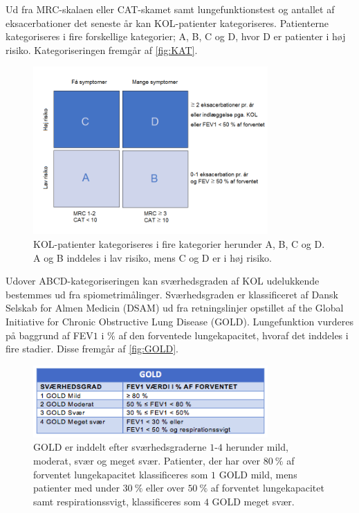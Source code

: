 Ud fra MRC-skalaen eller CAT-skamet samt lungefunktionstest og antallet af eksacerbationer det seneste år kan KOL-patienter kategoriseres. Patienterne kategoriseres i fire forskellige kategorier; A, B, C og D, hvor D er patienter i høj risiko. Kategoriseringen fremgår af \autoref{fig:KAT}.

\begin{figure} [H]
\centering
\includegraphics[width=0.8\textwidth]{figures/KAT}
\caption{KOL-patienter kategoriseres i fire kategorier herunder A, B, C og D. A og B inddeles i lav risiko, mens C og D er i høj risiko.}
\label{fig:KAT}
\end{figure} 
 
\noindent
Udover ABCD-kategoriseringen kan sværhedsgraden af KOL udelukkende bestemmes ud fra spiometrimålinger. Sværhedsgraden er klassificeret af Dansk Selskab for Almen Medicin (DSAM) ud fra retningslinjer opstillet af the Global Initiative for Chronic Obstructive Lung Disease (GOLD). Lungefunktion vurderes på baggrund af FEV$1$ i \% af den forventede lungekapacitet, hvoraf det inddeles i fire stadier. Disse fremgår af \autoref{fig:GOLD}.

\begin{figure} [H]
\centering
\includegraphics[width=0.8\textwidth]{figures/GOLD}
\caption{GOLD er inddelt efter sværhedsgraderne $1$-$4$ herunder mild, moderat, svær og meget svær. Patienter, der har over $80~\%$ af forventet lungekapacitet klassificeres som $1$ GOLD mild, mens patienter med under $30~\%$ eller over $50~\%$ af forventet lungekapacitet samt respirationssvigt, klassificeres som $4$ GOLD meget svær.}
\label{fig:GOLD}
\end{figure} 

